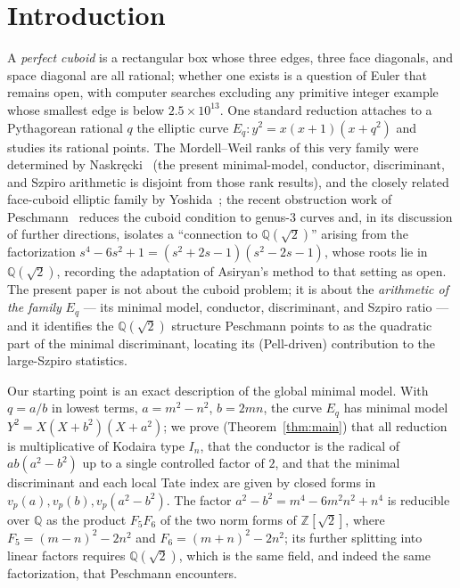\documentclass[11pt,reqno]{amsart}
\theoremstyle{plain}
\theoremstyle{definition}
\newcommand{\Q}{\mathbb{Q}}
\newcommand{\Z}{\mathbb{Z}}
\begin{document}
\section{Introduction}

A \emph{perfect cuboid} is a rectangular box whose three edges, three face
diagonals, and space diagonal are all rational; whether one exists is a question
of Euler that remains open, with computer searches excluding any primitive
integer example whose smallest edge is below $2.5\times10^{13}$. One standard reduction
attaches to a Pythagorean rational $q$ the elliptic curve
$E_q\colon y^2=x(x+1)(x+q^2)$ and studies its rational points. The
Mordell--Weil ranks of this very family were determined by
Naskr\k{e}cki~\cite{naskrecki} (the present minimal-model, conductor, discriminant,
and Szpiro arithmetic is disjoint from those rank results), and the closely related
face-cuboid elliptic family by Yoshida~\cite{yoshida}; the recent obstruction work of
Peschmann~\cite{peschmann} reduces the cuboid condition to genus-$3$ curves and,
in its discussion of further directions, isolates a ``connection to $\Q(\sqrt2)$''
arising from the factorization $s^4-6s^2+1=(s^2+2s-1)(s^2-2s-1)$, whose roots lie
in $\Q(\sqrt2)$, recording the adaptation of Asiryan's method to that setting as
open. The present paper is not about the cuboid problem; it is about the
\emph{arithmetic of the family} $E_q$ --- its minimal model, conductor,
discriminant, and Szpiro ratio --- and it identifies the $\Q(\sqrt2)$ structure
Peschmann points to as the quadratic part of the minimal discriminant, locating its
(Pell-driven) contribution to the large-Szpiro statistics.

Our starting point is an exact description of the global minimal model. With
$q=a/b$ in lowest terms, $a=m^2-n^2$, $b=2mn$, the curve $E_q$ has minimal model
$Y^2=X(X+b^2)(X+a^2)$; we prove (Theorem~\ref{thm:main}) that all reduction is
multiplicative of Kodaira type $I_n$, that the conductor is the radical of
$ab(a^2-b^2)$ up to a single controlled factor of $2$, and that the minimal
discriminant and each local Tate index are given by closed forms in
$v_p(a),v_p(b),v_p(a^2-b^2)$. The factor $a^2-b^2=m^4-6m^2n^2+n^4$ is reducible
over $\Q$ as the product $F_5F_6$ of the two norm forms of $\Z[\sqrt2]$, where
$F_5=(m-n)^2-2n^2$ and $F_6=(m+n)^2-2n^2$; its further splitting into linear
factors requires $\Q(\sqrt2)$, which is the same field, and indeed the same
factorization, that Peschmann encounters.
\end{document}
